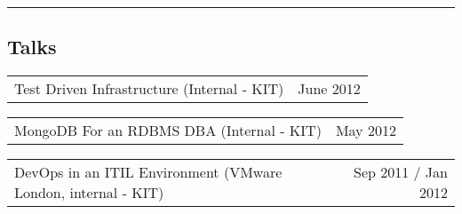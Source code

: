 \documentclass[10pt,a4paper]{article}
\makeatletter
\newcommand{\headerrow}[2]
{\begin{tabular*}{\linewidth}{l@{\extracolsep{\fill}}r}
	#1 &
	#2 \\
\end{tabular*}}
\makeatother
\begin{document}
\hrule
\vspace{-0.4em}
\subsection*{Talks}
    \headerrow
		{Test Driven Infrastructure (Internal - KIT)}
		{June 2012}
    \headerrow
		{MongoDB For an RDBMS DBA (Internal - KIT)}
		{May 2012}
    \headerrow
		{DevOps in an ITIL Environment (VMware London, internal - KIT)}
		{Sep 2011 / Jan 2012}
\end{document}
